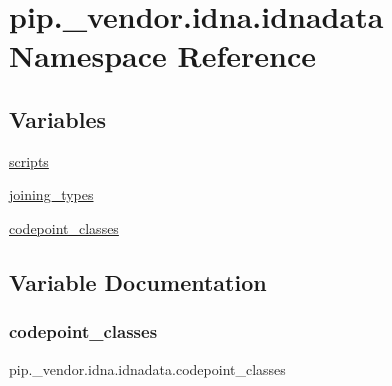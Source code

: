 \hypertarget{namespacepip_1_1__vendor_1_1idna_1_1idnadata}{}\section{pip.\+\_\+vendor.\+idna.\+idnadata Namespace Reference}
\label{namespacepip_1_1__vendor_1_1idna_1_1idnadata}
\subsection*{Variables}
\begin{DoxyCompactItemize}
\item 
\hyperlink{namespacepip_1_1__vendor_1_1idna_1_1idnadata_a30b9a8f364fbc7f6fba532ba48efaea5}{scripts}
\item 
\hyperlink{namespacepip_1_1__vendor_1_1idna_1_1idnadata_a419d23e37fb0b8e6a06c6cdb20a63403}{joining\+\_\+types}
\item 
\hyperlink{namespacepip_1_1__vendor_1_1idna_1_1idnadata_aa0e39eadfd1627fbe2f7562b853c1de9}{codepoint\+\_\+classes}
\end{DoxyCompactItemize}


\subsection{Variable Documentation}
\mbox{\label{namespacepip_1_1__vendor_1_1idna_1_1idnadata_aa0e39eadfd1627fbe2f7562b853c1de9}} 
\subsubsection{\texorpdfstring{codepoint\+\_\+classes}{codepoint\_classes}}
{\footnotesize\ttfamily pip.\+\_\+vendor.\+idna.\+idnadata.\+codepoint\+\_\+classes}

\mbox{\label{namespacepip_1_1__vendor_1_1idna_1_1idnadata_a419d23e37fb0b8e6a06c6cdb20a63403}} 
